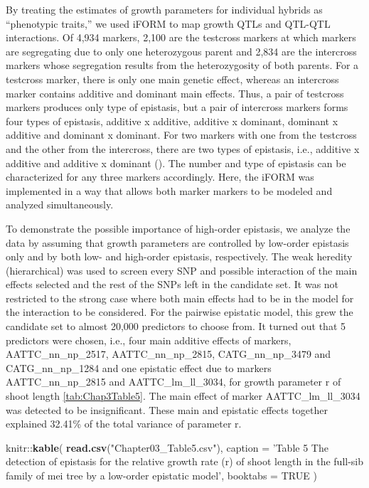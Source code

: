 \documentclass[11pt,]{book}
\newenvironment{Shaded}{\begin{snugshade}}{\end{snugshade}}
\newcommand{\KeywordTok}[1]{\textcolor[rgb]{0.13,0.29,0.53}{\textbf{{#1}}}}
\newcommand{\DataTypeTok}[1]{\textcolor[rgb]{0.13,0.29,0.53}{{#1}}}
\newcommand{\StringTok}[1]{\textcolor[rgb]{0.31,0.60,0.02}{{#1}}}
\newcommand{\OtherTok}[1]{\textcolor[rgb]{0.56,0.35,0.01}{{#1}}}
\newcommand{\NormalTok}[1]{{#1}}
\theoremstyle{definition}
\theoremstyle{definition}
\theoremstyle{remark}
\begin{document}
By treating the estimates of growth parameters for individual hybrids as
``phenotypic traits,'' we used iFORM to map growth QTLs and QTL-QTL
interactions. Of 4,934 markers, 2,100 are the testcross markers at which
markers are segregating due to only one heterozygous parent and 2,834
are the intercross markers whose segregation results from the
heterozygosity of both parents. For a testcross marker, there is only
one main genetic effect, whereas an intercross marker contains additive
and dominant main effects. Thus, a pair of testcross markers produces
only type of epistasis, but a pair of intercross markers forms four
types of epistasis, additive x additive, additive x dominant, dominant x
additive and dominant x dominant. For two markers with one from the
testcross and the other from the intercross, there are two types of
epistasis, i.e., additive x additive and additive x dominant
(\cite{tong20113funmap}). The number and type of epistasis can be
characterized for any three markers accordingly. Here, the iFORM was
implemented in a way that allows both marker markers to be modeled and
analyzed simultaneously.

To demonstrate the possible importance of high-order epistasis, we
analyze the data by assuming that growth parameters are controlled by
low-order epistasis only and by both low- and high-order epistasis,
respectively. The weak heredity (hierarchical) was used to screen every
SNP and possible interaction of the main effects selected and the rest
of the SNPs left in the candidate set. It was not restricted to the
strong case where both main effects had to be in the model for the
interaction to be considered. For the pairwise epistatic model, this
grew the candidate set to almost 20,000 predictors to choose from. It
turned out that 5 predictors were chosen, i.e., four main additive
effects of markers, AATTC\_nn\_np\_2517, AATTC\_nn\_np\_2815,
CATG\_nn\_np\_3479 and CATG\_nn\_np\_1284 and one epistatic effect due
to markers AATTC\_nn\_np\_2815 and AATTC\_lm\_ll\_3034, for growth
parameter r of shoot length \ref{tab:Chap3Table5}. The main effect of
marker AATTC\_lm\_ll\_3034 was detected to be insignificant. These main
and epistatic effects together explained 32.41\% of the total variance
of parameter r.

\begin{Shaded}
\begin{Highlighting}[]
\NormalTok{knitr::}\KeywordTok{kable}\NormalTok{(}
  \KeywordTok{read.csv}\NormalTok{(}\StringTok{"Chapter03_Table5.csv"}\NormalTok{), }\DataTypeTok{caption =} \StringTok{'Table 5 The detection of epistasis for the relative growth rate (r) of shoot length in the full-sib family of mei tree by a low-order epistatic model'}\NormalTok{,}
  \DataTypeTok{booktabs =} \OtherTok{TRUE}
\NormalTok{)}
\end{Highlighting}
\end{Shaded}
\end{document}

